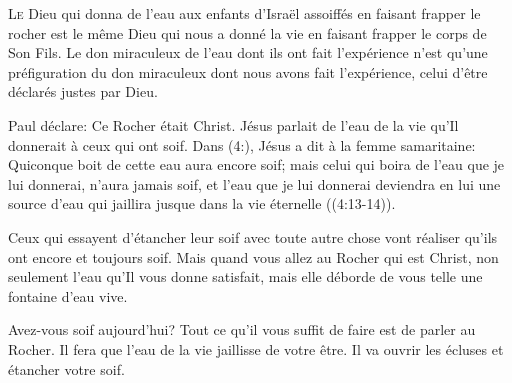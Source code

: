 \dvrule







\lettrine{L}{e} Dieu qui donna de l'eau aux enfants d'Israël
 assoiffés en faisant frapper le rocher
 est le même Dieu qui nous a donné la vie
 en faisant frapper le corps de Son Fils.
 Le don miraculeux de l'eau dont ils ont fait l'expérience
 n'est qu'une préfiguration du don miraculeux
 dont nous avons fait l'expérience,
 celui d'être déclarés justes par Dieu.


Paul déclare:
 \Og Ce Rocher était Christ. \Fg{}
 Jésus parlait de l'eau de la vie qu'Il donnerait
 à ceux qui ont soif. Dans (4:),
 Jésus a dit à la femme samaritaine:
 \Og Quiconque boit de cette eau aura encore soif;
 mais celui qui boira de l'eau que je lui donnerai,
 n'aura jamais soif, et l'eau que je lui donnerai
 deviendra en lui une source d'eau qui jaillira
 jusque dans la vie éternelle \Fg{}
 ((4:13-14)).

Ceux qui essayent d'étancher leur soif
 avec toute autre chose vont réaliser qu'ils ont encore et toujours soif.
 Mais quand vous allez au Rocher qui est Christ,
 non seulement l'eau qu'Il vous donne satisfait,
 mais elle déborde de vous telle une fontaine d'eau vive.

Avez-vous soif aujourd'hui?
 Tout ce qu'il vous suffit de faire est de parler au Rocher.
 Il fera que l'eau de la vie jaillisse de votre être.
 Il va ouvrir les écluses et étancher votre soif.

\dvrule



